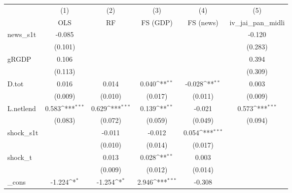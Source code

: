 {
\def\sym#1{\ifmmode^{#1}\else\(^{#1}\)\fi}
\begin{tabular}{l*{5}{c}}
\toprule
            &\multicolumn{1}{c}{(1)}&\multicolumn{1}{c}{(2)}&\multicolumn{1}{c}{(3)}&\multicolumn{1}{c}{(4)}&\multicolumn{1}{c}{(5)}\\
            &\multicolumn{1}{c}{OLS}&\multicolumn{1}{c}{RF}&\multicolumn{1}{c}{FS (GDP)}&\multicolumn{1}{c}{FS (news)}&\multicolumn{1}{c}{iv\_jai\_pan\_midli}\\
\midrule
news\_s1t    &      -0.085         &                     &                     &                     &      -0.120         \\
            &     (0.101)         &                     &                     &                     &     (0.283)         \\
\addlinespace
gRGDP       &       0.106         &                     &                     &                     &       0.394         \\
            &     (0.113)         &                     &                     &                     &     (0.309)         \\
\addlinespace
D.tot       &       0.016         &       0.014         &       0.040\sym{**} &      -0.028\sym{**} &       0.003         \\
            &     (0.009)         &     (0.010)         &     (0.017)         &     (0.011)         &     (0.009)         \\
\addlinespace
L.netlend   &       0.583\sym{***}&       0.629\sym{***}&       0.139\sym{**} &      -0.021         &       0.573\sym{***}\\
            &     (0.083)         &     (0.072)         &     (0.059)         &     (0.049)         &     (0.094)         \\
\addlinespace
shock\_s1t   &                     &      -0.011         &      -0.012         &       0.054\sym{***}&                     \\
            &                     &     (0.010)         &     (0.014)         &     (0.017)         &                     \\
\addlinespace
shock\_t     &                     &       0.013         &       0.028\sym{**} &       0.003         &                     \\
            &                     &     (0.009)         &     (0.012)         &     (0.014)         &                     \\
\addlinespace
\_cons      &      -1.224\sym{*}  &      -1.254\sym{*}  &       2.946\sym{***}&      -0.308         &                     \\

\end{tabular}}
